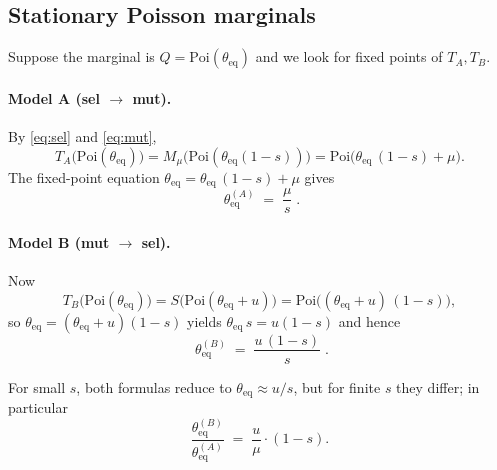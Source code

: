 \documentclass[11pt]{article}
\newcommand{\Poi}{\mathrm{Poi}}
\begin{document}
\subsection*{Stationary Poisson marginals}
Suppose the marginal is $Q=\Poi(\theta_{\mathrm{eq}})$ and we look for
fixed points of $T_A,T_B$.

\paragraph{Model A (sel $\to$ mut).}
By \eqref{eq:sel} and \eqref{eq:mut},
\[
  T_A\bigl(\Poi(\theta_{\mathrm{eq}})\bigr)
  = M_\mu\bigl(\Poi(\theta_{\mathrm{eq}}(1-{s}))\bigr)
  = \Poi\bigl(\theta_{\mathrm{eq}}\,(1-{s})+\mu\bigr).
\]
The fixed-point equation
$\theta_{\mathrm{eq}}=\theta_{\mathrm{eq}}\,(1-{s})+\mu$ gives
\begin{equation}\label{eq:thetaA}
  \boxed{\;\theta_{\mathrm{eq}}^{(A)}\;=\;\frac{\mu}{{s}}\;.}
\end{equation}

\paragraph{Model B (mut $\to$ sel).}
Now
\[
  T_B\bigl(\Poi(\theta_{\mathrm{eq}})\bigr)
  = S\bigl(\Poi(\theta_{\mathrm{eq}}+{u})\bigr)
  = \Poi\bigl((\theta_{\mathrm{eq}}+{u})\,(1-{s})\bigr),
\]
so $\theta_{\mathrm{eq}}=(\theta_{\mathrm{eq}}+{u})(1-{s})$ yields
$\theta_{\mathrm{eq}}\,{s}={u}(1-{s})$ and hence
\begin{equation}\label{eq:thetaB}
  \boxed{\;\theta_{\mathrm{eq}}^{(B)}
        \;=\;\frac{{u}\,(1-{s})}{{s}}\;.}
\end{equation}

For small ${s}$, both formulas reduce to $\theta_{\mathrm{eq}}\approx{u}/{s}$, but for
finite ${s}$ they differ; in particular
\[
  \frac{\theta_{\mathrm{eq}}^{(B)}}{\theta_{\mathrm{eq}}^{(A)}}
  \;=\;\frac{{u}}{\mu}\cdot(1-{s}).
\]
\end{document}
